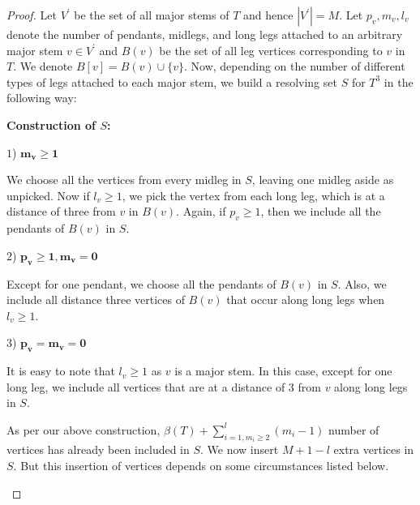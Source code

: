 \documentclass{article}
\theoremstyle{definition}
\numberwithin{equation}{section}
\begin{document}
\begin{proof}
\noindent Let $V^{\prime}$ be the set of all major stems 
of $T$ and hence $|V^{\prime}|=M$. Let $p_{v}, m_{v}, l_{v}$ denote the number of pendants, midlegs, and long legs attached to an arbitrary major stem $v\in V^{\prime}$ and $B(v)$ be the set of all leg vertices corresponding to $v$ in $T$. We denote $B[v]=B(v)\cup \{v\}$. Now, depending on the number of different types of legs attached to each major stem, we build a resolving set $S$ for $T^{3}$ in the following way:

\vspace{0.7em}
\noindent \textbf{Construction of $S$:}
\vspace{0.4em}

\noindent $1$) $\mathbf{m_{v}\geq 1}$
\vspace{0.4em}

We choose all the vertices from every midleg in $S$, leaving one midleg aside as unpicked. Now if $l_{v}\geq 1$, we pick the vertex from each long leg, which is at a distance of three from $v$ in $B(v)$. Again, if $p_{v}\geq 1$, then we include all the pendants of $B(v)$ in $S$. 
\vspace{0.4em}

\noindent $2$) $\mathbf{p_{v}\geq 1, m_{v}=0}$
\vspace{0.4em}

Except for one pendant, we choose all the pendants of $B(v)$ in $S$. Also, we include all distance three vertices of $B(v)$ that occur along long legs when $l_{v}\geq 1$.
 
\vspace{0.4em}


\noindent $3$) $\mathbf{p_{v}=m_{v}=0}$
\vspace{0.4em}

It is easy to note that $l_{v}\geq 1$ as $v$ is a major stem. In this case, except for one long leg, we include all vertices that are at a distance of $3$ from $v$ along long legs in $S$.

\noindent As per our above construction, $\beta{(T)}+\sum\limits_{i=1,m_{i}\geq 2}^{l} (m_{i}-1)$ number of vertices has already been included in $S$. We now insert $M+1-l$ extra vertices in $S$. But this insertion of vertices depends on some circumstances listed below.
\begin{figure}[ht]\label{bounds1}
\begin{center}
\end{center}
\end{figure}
\end{proof}
\end{document}
